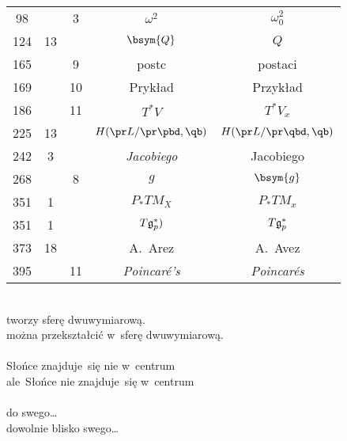 \documentclass[a4paper,11pt]{article}
\begin{document}
\begin{center}
\begin{tabular}{|c|c|c|c|c|}
    98  & &  3 & $\omega^{ 2 }$ & $\omega_{ 0 }^{ 2 }$ \\
    124 & 13 & & $\bsym{Q}$ & $Q$ \\
    165 & &  9 & postc & postaci \\
    169 & & 10 & Prykład & Przykład \\
    186 & & 11 & $T^{ * }V$ & $T^{ * }V_{ x }$ \\
    225 & 13 & & $H( \pr L / \pr \pbd, \qb )$
           & $H( \pr L / \pr \qbd, \qb )$ \\
    242 &  3 & & \emph{Jacobiego} & Jacobiego \\
    268 & &  8 & $g$ & $\bsym{g}$ \\
    351 &  1 & & $P_{ * }TM_{ X }$ & $P_{ * }TM_{ x }$ \\
    351 &  1 & & $T\mathfrak{g}_{ p }^{ * })$ & $T\mathfrak{g}_{ p }^{ * }$ \\
    373 & 18 & & A.~Arez & A.~Avez \\
    395 & & 11 & \emph{Poincar\'{e}'s} & \emph{Poincar\'{e}s} \\
    \hline
  \end{tabular}
\end{center}
\noi
{} \\
\Jest tworzy sferę dwuwymiarową. \\
\Powin można przekształcić w~sferę dwuwymiarową. \\
 \\
\Jest Słońce znajduje~się nie w~centrum \\
\Powin ale~Słońce nie znajduje~się w~centrum \\
 \\
\Jest  do swego\ldots \\
\Powin dowolnie blisko swego\ldots \\

\vspace{\spaceTwo}









\end{document}
